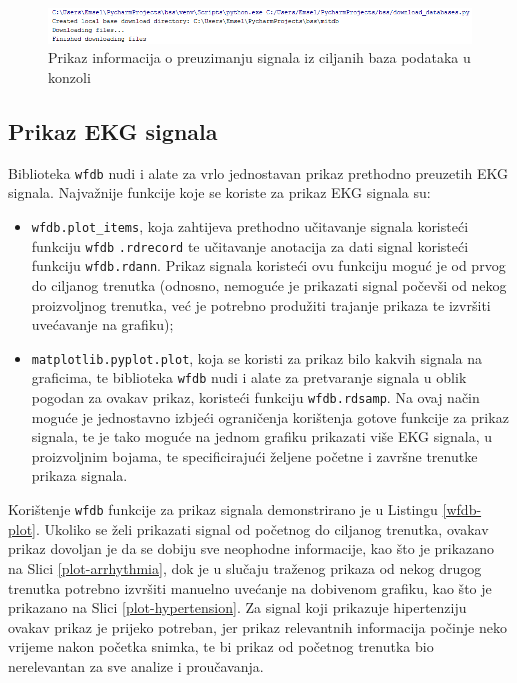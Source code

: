 \documentclass[12pt,a4paper]{article}
\begin{document}
\begin{figure}[H]
\center
\includegraphics[scale=0.7]{../res/download.PNG}
\caption{Prikaz informacija o preuzimanju signala iz ciljanih baza podataka u konzoli}
\label{download}
\end{figure}

\subsection{Prikaz EKG signala}

\quad Biblioteka \texttt{wfdb} nudi i alate za vrlo jednostavan prikaz prethodno preuzetih EKG signala. Najvažnije funkcije koje se koriste za prikaz EKG signala su:

\begin{itemize}
\renewcommand\labelitemi{-}

\item \texttt{wfdb.plot\_items}, koja zahtijeva prethodno učitavanje signala koristeći funkciju \texttt{wfdb} \texttt{.rdrecord} te učitavanje anotacija za dati signal koristeći funkciju \texttt{wfdb.rdann}. Prikaz signala koristeći ovu funkciju moguć je od prvog do ciljanog trenutka (odnosno, nemoguće je prikazati signal počevši od nekog proizvoljnog trenutka, već je potrebno produžiti trajanje prikaza te izvršiti uvećavanje na grafiku);

\item \texttt{matplotlib.pyplot.plot}, koja se koristi za prikaz bilo kakvih signala na graficima, te biblioteka \texttt{wfdb} nudi i alate za pretvaranje signala u oblik pogodan za ovakav prikaz, koristeći funkciju \texttt{wfdb.rdsamp}. Na ovaj način moguće je jednostavno izbjeći ograničenja korištenja gotove funkcije za prikaz signala, te je tako moguće na jednom grafiku prikazati više EKG signala, u proizvoljnim bojama, te specificirajući željene početne i završne trenutke prikaza signala.

\end{itemize}

Korištenje \texttt{wfdb} funkcije za prikaz signala demonstrirano je u Listingu \ref{wfdb-plot}. Ukoliko se želi prikazati signal od početnog do ciljanog trenutka, ovakav prikaz dovoljan je da se dobiju sve neophodne informacije, kao što je prikazano na Slici \ref{plot-arrhythmia}, dok je u slučaju traženog prikaza od nekog drugog trenutka potrebno izvršiti manuelno uvećanje na dobivenom grafiku, kao što je prikazano na Slici \ref{plot-hypertension}. Za signal koji prikazuje hipertenziju ovakav prikaz je prijeko potreban, jer prikaz relevantnih informacija počinje neko vrijeme nakon početka snimka, te bi prikaz od početnog trenutka bio nerelevantan za sve analize i proučavanja. 
\end{document}
